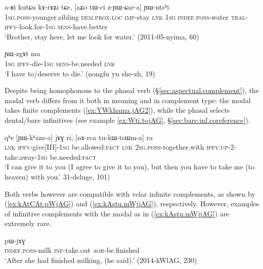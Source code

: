 \begin{exe} 
\ex \label{ex:zYWCara.YWntshi}
\gll a-ʁi kutɕu kɤ-rɤʑi tɕe, [aʑo tɯ-ci z-ɲɯ-ɕar-a] ɲɯ-ntsʰi \\
\textsc{1sg}.\textsc{poss}-younger.sibling \textsc{dem}.\textsc{prox}:\textsc{loc} \textsc{imp}-stay \textsc{lnk} \textsc{1sg} \textsc{indef}.\textsc{poss}-water \textsc{tral}-\textsc{ipfv}-look.for-\textsc{1sg} \textsc{sens}-have.better \\
\glt `Brother, stay here, let me look for water.' (2011-05-nyima, 60)
\end{exe} 

\begin{exe} 
\ex \label{ex:pjWsia.YWzgAt}
 ɲɯ-zgɤt ma \\
\textsc{1sg} \textsc{ipfv}-die-\textsc{1sg} \textsc{sens}-be.needed \textsc{lnk} \\
\glt `I have to/deserve to die.' (nongfu yu she-zh, 19)
\end{exe} 


Despite being homophonous to the phasal verb  (§\ref{sec:aspectual.complement}), the modal verb   differs from it both in meaning and in complement type: the modal  takes finite complements (\ref{ex:YWkhama.jAG2}), while the phasal  selects dental/bare infinitives (see example \ref{ex:Wti.tojAG}, §\ref{sec:bare.inf.coreference}).

\begin{exe} 
\ex \label{ex:YWkhama.jAG2}
\gll qʰe [ɲɯ-kʰam-a] jɤɣ ri, [nɤ-rca tu-kɯ-tsɯm-a] ra \\
\textsc{lnk} \textsc{ipfv}-give[III]-\textsc{1sg} be.allowed:\textsc{fact} \textsc{lnk} \textsc{2sg}.\textsc{poss}-together.with \textsc{ipfv}:\textsc{up}-2\fl{}-take.away-\textsc{1sg} be.needed:\textsc{fact} \\
\glt `I can give it to you (I agree to give it to you), but then you have to take me (to heaven) with you.' 31-deluge, 101)
\end{exe} 

Both verbs however are compatible with velar infinite complements, as shown by (\ref{ex:kAtCAt.pWjAG}) and (\ref{ex:kAstu.mWjjAG}), respectively. However, examples of infinitive complements with the modal  as in (\ref{ex:kAstu.mWjjAG}) are extremely rare.

\begin{exe} 
\ex \label{ex:kAtCAt.pWjAG}
\gll [tɤ-lu kɤ-tɕɤt] pɯ-jɤɣ \\
\textsc{indef}.\textsc{poss}-milk \textsc{inf}-take.out \textsc{aor}-be.finished \\
\glt `After she had finished milking, (he said).' (2014-kWlAG, 230)
\end{exe} 

